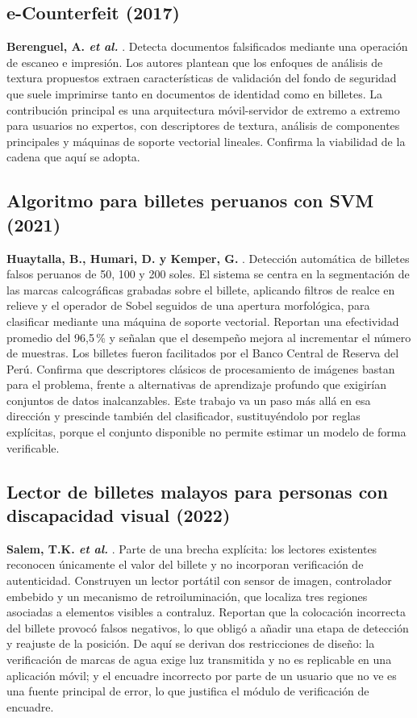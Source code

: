 \documentclass[conference]{IEEEtran}
\begin{document}
\subsection{e-Counterfeit (2017)}
\textbf{Berenguel, A. \textit{et al.}} \cite{ecounterfeit2017}. Detecta
documentos falsificados mediante una operación de escaneo e impresión.
Los autores plantean que los enfoques de análisis de textura propuestos
extraen características de validación del fondo de seguridad que suele
imprimirse tanto en documentos de identidad como en billetes. La
contribución principal es una arquitectura móvil-servidor de extremo a
extremo para usuarios no expertos, con descriptores de textura, análisis
de componentes principales y máquinas de soporte vectorial lineales.
Confirma la viabilidad de la cadena que aquí se adopta.

\subsection{Algoritmo para billetes peruanos con SVM (2021)}
\textbf{Huaytalla, B., Humari, D. y Kemper, G.} \cite{huaytalla2021}.
Detección automática de billetes falsos peruanos de 50, 100 y 200 soles.
El sistema se centra en la segmentación de las marcas calcográficas
grabadas sobre el billete, aplicando filtros de realce en relieve y el
operador de Sobel seguidos de una apertura morfológica, para clasificar
mediante una máquina de soporte vectorial. Reportan una efectividad
promedio del 96{,}5\,\% y señalan que el desempeño mejora al incrementar
el número de muestras. Los billetes fueron facilitados por el Banco
Central de Reserva del Perú. Confirma que descriptores clásicos de
procesamiento de imágenes bastan para el problema, frente a
alternativas de aprendizaje profundo que exigirían conjuntos de datos
inalcanzables. Este trabajo va un paso más allá en esa dirección y
prescinde también del clasificador, sustituyéndolo por reglas
explícitas, porque el conjunto disponible no permite estimar un modelo
de forma verificable.

\subsection{Lector de billetes malayos para personas con discapacidad
visual (2022)}
\textbf{Salem, T.K. \textit{et al.}} \cite{salem2022}. Parte de una
brecha explícita: los lectores existentes reconocen únicamente el valor
del billete y no incorporan verificación de autenticidad. Construyen un
lector portátil con sensor de imagen, controlador embebido y un
mecanismo de retroiluminación, que localiza tres regiones asociadas a
elementos visibles a contraluz. Reportan que la colocación incorrecta
del billete provocó falsos negativos, lo que obligó a añadir una etapa
de detección y reajuste de la posición. De aquí se derivan dos
restricciones de diseño: la verificación de marcas de agua exige luz
transmitida y no es replicable en una aplicación móvil; y el encuadre
incorrecto por parte de un usuario que no ve es una fuente principal de
error, lo que justifica el módulo de verificación de encuadre.
\end{document}
